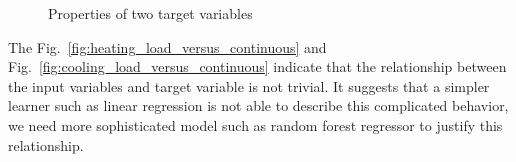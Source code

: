 \documentclass{article}
\begin{document}
\begin{figure}[!bht]
\centering     \captionsetup{font=footnotesize, width=.6\textwidth}
{}
\caption{Properties of two target variables} 
\end{figure}

The Fig.~\ref{fig:heating_load_versus_continuous} and Fig.~\ref{fig:cooling_load_versus_continuous} indicate that the relationship between the input variables and target variable is not trivial. It suggests that a simpler learner such as linear regression is not able to describe this complicated behavior, we need more sophisticated model such as random forest regressor to justify this relationship.
\end{document}
